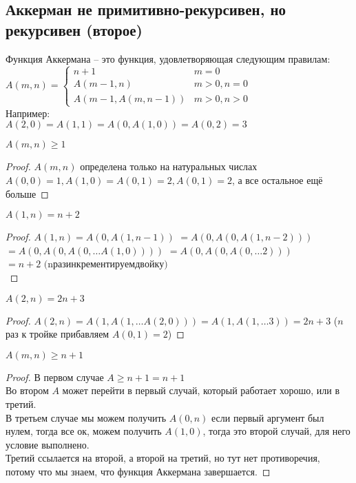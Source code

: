 \subsection{Аккерман не примитивно-рекурсивен, но рекурсивен (второе)}
\label{sec-10-3}
Функция Аккермана -- это функция, удовлетворяющая следующим правилам:\\
$A(m,n) = \begin{cases}
   n+1 & m = 0\\
   A(m-1,n) & m > 0, n = 0\\
   A(m-1,A(m,n-1)) & m > 0, n > 0
\end{cases}$\\
Например:\\
$A(2, 0) = A(1, 1) = A(0, A(1, 0)) = A(0, 2) = 3$
\begin{lemma}
$A(m, n) \geq 1$
\end{lemma}
\begin{proof}
$A(m, n)$ определена только на натуральных числах\\
$A(0, 0) = 1, A(1, 0) = A(0, 1) = 2, A(0, 1) = 2$, а все остальное ещё больше
\end{proof}
\begin{lemma}
$A(1, n) = n + 2$
\end{lemma}
\label{lemma1a}
\begin{proof}
$A(1, n) = A(0, A(1, n - 1))$
$= A(0, A(0, A(1, n - 2)))$\\
$= A(0, A(0, A(0, \ldots{} A(1, 0))))$
$= A(0, A(0, A(0, \ldots{} 2)))$\\
$= n + 2$ $ ($n$ раз инкрементируем двойку)$\\
\end{proof}
\begin{lemma}
$A(2, n) = 2n + 3$
\end{lemma}
\label{lemma1b}
\begin{proof}
$A(2, n)
= A(1, A(1, \ldots{} A(2, 0)))
= A(1, A(1, \ldots{} 3))
= 2n + 3$ ($n$ раз к тройке прибавляем $A(0, 1) = 2$)
\end{proof}
\begin{lemma}
$A(m, n) \geq n + 1$
\end{lemma}
\label{lemma2}
\begin{proof}
В первом случае $A \geq n + 1 = n + 1$\\
Во втором $A$ может перейти в первый случай, который работает
хорошо, или в третий.\\
В третьем случае мы можем получить $A(0, n)$ если первый аргумент
был нулем, тогда все ок, можем получить $A(1, 0)$, тогда это второй
случай, для него условие выполнено.\\
Третий ссылается на второй, а второй на третий, но тут
нет противоречия, потому что мы знаем, что функция Аккермана
завершается.
\end{proof}
